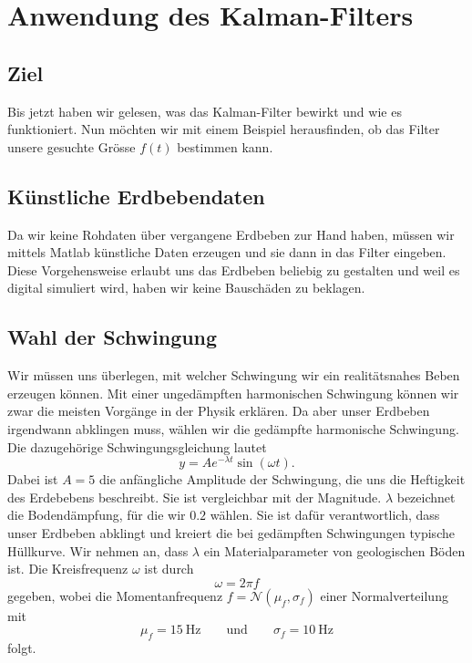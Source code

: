 \section{Anwendung des Kalman-Filters}
\subsection{Ziel}
Bis jetzt haben wir gelesen, was das Kalman-Filter bewirkt und wie es funktioniert.
Nun möchten wir mit einem Beispiel herausfinden,
ob das Filter unsere gesuchte Grösse $f(t)$ bestimmen kann.

\subsection{Künstliche Erdbebendaten}
Da wir keine Rohdaten über vergangene Erdbeben zur Hand haben, müssen wir mittels Matlab künstliche Daten erzeugen und sie dann in das Filter eingeben.
Diese Vorgehensweise erlaubt uns das Erdbeben beliebig zu gestalten
und weil es digital simuliert wird,
haben wir keine Bauschäden zu beklagen.

\subsection{Wahl der Schwingung}
Wir müssen uns überlegen, mit welcher Schwingung wir ein realitätsnahes Beben erzeugen können.
Mit einer ungedämpften harmonischen Schwingung können wir zwar die meisten Vorgänge in der Physik erklären.
Da aber unser Erdbeben irgendwann abklingen muss, wählen wir die gedämpfte harmonische Schwingung.
Die dazugehörige Schwingungsgleichung lautet
\begin{equation}
	y = A e^{-\lambda t} \sin(\omega t).
\end{equation}
Dabei ist $A=5$ die anfängliche Amplitude der Schwingung,
die uns die Heftigkeit des Erdebebens beschreibt.
Sie ist vergleichbar mit der Magnitude.
$\lambda$ bezeichnet die Bodendämpfung, für die wir $0.2$ wählen.
Sie ist dafür verantwortlich, dass unser Erdbeben abklingt
und kreiert die bei gedämpften Schwingungen typische Hüllkurve.
Wir nehmen an, dass $\lambda$ ein Materialparameter von geologischen Böden ist.
Die Kreisfrequenz $\omega$ ist durch
\begin{equation}
	\omega = 2 \pi f
\end{equation}
gegeben, 
wobei die Momentanfrequenz $f = \mathcal N(\mu_f, \sigma_f) $ einer Normalverteilung mit
\begin{equation}
  \mu_f = \SI{15}{\hertz}
  \qquad \text{und} \qquad
  \sigma_f = \SI{10}{\hertz}
\end{equation}
folgt.

